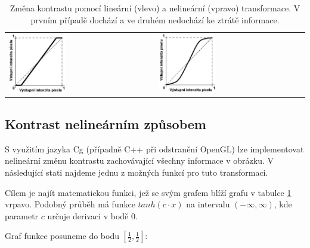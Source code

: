 \noindent
\begin{table}[ht]
	\label{kontrast}
	\centering
		\begin{tabular}{p{}p{}}
			\includegraphics[width=0.4\textwidth,height=0.4\textwidth]{Text/IMG/Kontrast_Transformace_1.jpg}
		&
			\includegraphics[width=0.4\textwidth,height=0.4\textwidth]{Text/IMG/Kontrast_Transformace_2.jpg}
		\end{tabular}
	\caption{Změna kontrastu pomocí lineární (vlevo) a nelineární (vpravo) transformace. V prvním případě dochází a ve druhém nedochází ke ztrátě informace.}
\end{table}



\subsection{Kontrast nelineárním způsobem}
S využitím jazyka Cg (případně C++ při odstranění OpenGL) lze implementovat nelineární změnu kontrastu zachovávající všechny informace v obrázku. V následující stati najdeme jednu z možných funkcí pro tuto transformaci.

Cílem je najít matematickou funkci, jež se svým grafem blíží grafu v tabulce \ref{kontrast} vrpavo. Podobný průběh má funkce $tanh(c\cdot x)$ na intervalu $(-\infty,\infty)$, kde parametr $c$ určuje derivaci v bodě $0$.

Graf funkce posuneme do bodu  $[\frac{1}{2},\frac{1}{2}]$:

